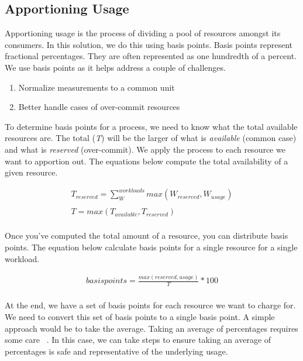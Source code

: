 \documentclass[10pt, a4paper, twocolumn]{article}
\begin{document}
  \subsection*{Apportioning Usage}
    Apportioning usage is the process of dividing a pool of resources amongst its consumers.
    In this solution, we do this using basis points.
    Basis points represent fractional percentages.
    They are often represented as one hundredth of a percent.
    We use basis points as it helps address a couple of challenges.

    \begin{enumerate}
      \item Normalize measurements to a common unit
      \item Better handle cases of over-commit resources
    \end{enumerate}

    To determine basis points for a process, we need to know what the total available resources are.
    The total (\textit{T}) will be the larger of what is \textit{available} (common case) and what is \textit{reserved} (over-commit).
    We apply the process to each resource we want to apportion out.
    The equations below compute the total availability of a given resource.

    \begin{gather*}
      T_{reserved} = \sum^{workloads}_{W} max(W_{reserved}, W_{usage}) \\
      \\
      T = max(T_{available}, T_{reserved}) \\
    \end{gather*}

    Once you've computed the total amount of a resource, you can distribute basis points.
    The equation below calculate basis points for a single resource for a single workload.

    \begin{gather*}
      basispoints = \frac{max(reserved, usage)}{T} * 100 \\
    \end{gather*}

    At the end, we have a set of basis points for each resource we want to charge for.
    We need to convert this set of basis points to a single basis point.
    A simple approach would be to take the average.
    Taking an average of percentages requires some care ~\cite{indeed,robertoreif}.
    In this case, we can take steps to ensure taking an average of percentages is safe and representative of the underlying usage.
\end{document}
